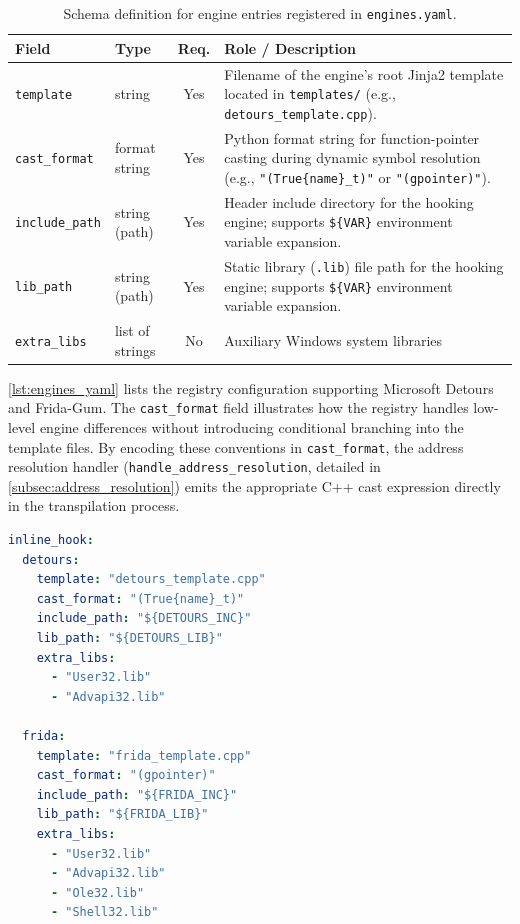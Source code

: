 \begin{table}[H]
	\centering
	\small
	\begin{tabularx}{\textwidth}{@{}llc>{\RaggedRight\arraybackslash}X@{}}
		\toprule
		\textbf{Field} & \textbf{Type} & \textbf{Req.} & \textbf{Role / Description} \\
		\midrule
		\texttt{template}      & string               & Yes & Filename of the engine's root Jinja2 template located in \texttt{templates/} (e.g., \texttt{detours\_template.cpp}). \\
		\addlinespace
		\texttt{cast\_format}  & format string        & Yes & Python format string for function-pointer casting during dynamic symbol resolution (e.g., \texttt{"(True\{name\}\_t)"} or \texttt{"(gpointer)"}). \\
		\addlinespace
		\texttt{include\_path} & string (path)        & Yes & Header include directory for the hooking engine; supports \texttt{\$\{VAR\}} environment variable expansion. \\
		\addlinespace
		\texttt{lib\_path}      & string (path)        & Yes & Static library (\texttt{.lib}) file path for the hooking engine; supports \texttt{\$\{VAR\}} environment variable expansion. \\
		\addlinespace
		\texttt{extra\_libs}   & list of strings      & No  & Auxiliary Windows system libraries \\
		\bottomrule
	\end{tabularx}
	\caption{Schema definition for engine entries registered in \texttt{engines.yaml}.}
	\label{tab:engine_registry_schema}
\end{table}

\cref{lst:engines_yaml} lists the registry configuration supporting Microsoft Detours and Frida-Gum.
The \texttt{cast\_format} field illustrates how the registry handles low-level engine differences without introducing conditional branching into the template files.
By encoding these conventions in \texttt{cast\_format}, the address resolution handler (\texttt{handle\_address\_resolution}, detailed in \cref{subsec:address_resolution}) emits the appropriate C++ cast expression directly in the transpilation process.

\begin{lstlisting}[language=yaml, mathescape=false, caption={Registry definitions for Detours and Frida-Gum in \texttt{engines.yaml}.}, label={lst:engines_yaml}, basicstyle=\ttfamily\footnotesize, breaklines=true]
inline_hook:
  detours:
    template: "detours_template.cpp"
    cast_format: "(True{name}_t)"
    include_path: "${DETOURS_INC}"
    lib_path: "${DETOURS_LIB}"
    extra_libs:
      - "User32.lib"
      - "Advapi32.lib"

  frida:
    template: "frida_template.cpp"
    cast_format: "(gpointer)"
    include_path: "${FRIDA_INC}"
    lib_path: "${FRIDA_LIB}"
    extra_libs:
      - "User32.lib"
      - "Advapi32.lib"
      - "Ole32.lib"
      - "Shell32.lib"
\end{lstlisting}

